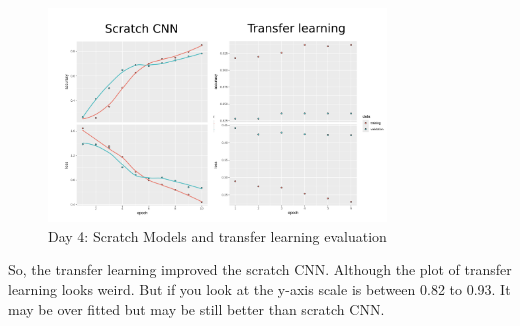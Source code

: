\documentclass[letterpaper,11pt]{article}
\begin{document}
\begin{figure}[H]
    \centering
    \includegraphics[width=0.8\textwidth]{Results/transfer_learning.jpg}
    \caption{Day 4: Scratch Models and transfer learning evaluation}
    \label{fig:D4_transfer_learning}
\end{figure}

So, the transfer learning improved the scratch CNN. Although the plot of transfer learning looks weird. But if you look at the y-axis scale is between 0.82 to 0.93. It may be over fitted but may be still better than scratch CNN.  


%
%
\end{document}
